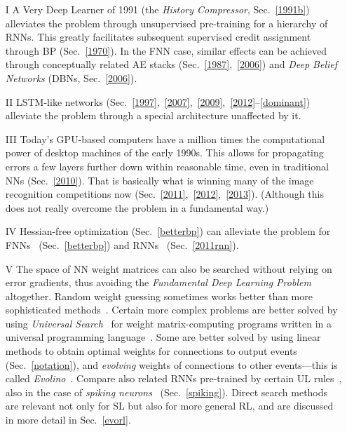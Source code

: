 \documentclass[letterpaper]{article}
\begin{document}
\begin{CJK*}{UTF8}{gbsn}
\begin{sloppypar}
\begin{itemize}
\item[I]
A Very Deep Learner of 1991 (the {\em History Compressor}, Sec.~\ref{1991b}) alleviates the problem through unsupervised pre-training for a hierarchy of RNNs. This greatly facilitates subsequent supervised credit assignment through BP (Sec.~\ref{1970}).
In the FNN case, similar effects can be achieved through conceptually related AE stacks (Sec.~\ref{1987},~\ref{2006}) and {\em Deep Belief Networks} (DBNs, Sec.~\ref{2006}).

\item[II]
LSTM-like networks (Sec.~\ref{1997},~\ref{2007},~\ref{2009},~\ref{2012}--\ref{dominant}) alleviate
 the problem through a special architecture unaffected by it.

\item[III]
Today's
GPU-based computers have a million times the computational power of desktop machines  of the early 1990s. 
This
allows for propagating errors a few layers further down within reasonable time, 
even in traditional NNs (Sec.~\ref{2010}). That is basically what is winning many of the image 
recognition competitions now (Sec.~\ref{2011},~\ref{2012},~\ref{2013}). (Although this does not really overcome the problem in a fundamental way.) 

\item[IV] 
Hessian-free optimization (Sec.~\ref{betterbp})
can alleviate the problem for FNNs~\citep{Moller:93,Pearlmutter:93,schraudolph02,icml2010_094} (Sec.~\ref{betterbp})
and RNNs~\citep{Martens:2011hessfree} (Sec.~\ref{2011rnn}).

\item[V] The space of NN weight matrices can also be searched without relying on error gradients,
thus avoiding the {\em Fundamental Deep Learning Problem} altogether.
Random weight guessing sometimes works better
than more sophisticated methods~\citep{Hochreiter:96sintra}.
Certain more complex problems are better solved by using 
{\em Universal Search}~\citep{Levin:73} for weight matrix-computing programs written in
a universal programming language~\citep{Schmidhuber:97nn+}.
Some are better solved by using linear methods 
to obtain optimal weights for connections to output events (Sec.~\ref{notation}),
and  {\em evolving} weights of connections to other events---this is called {\em Evolino}~\citep{Schmidhuber:07nc}.
Compare also related RNNs pre-trained by certain UL rules~\citep{steil2007},
also in the case of {\em spiking  neurons}~\citep{yin2012,maass2013} (Sec.~\ref{spiking}).
Direct search methods are relevant not only for SL but also for more general RL,
and are discussed in more detail in Sec.~\ref{evorl}.




\end{itemize}
\end{sloppypar}
\end{CJK*}
\end{document}
